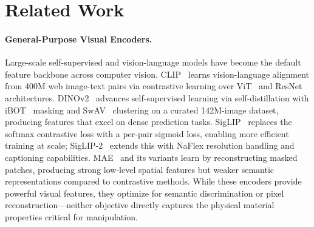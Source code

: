 \documentclass{article}
\begin{document}
\section{Related Work}
\label{sec:related}

\paragraph{General-Purpose Visual Encoders.}
Large-scale self-supervised and vision-language models have become the default feature backbone across computer vision. CLIP~\cite{radford2021clip} learns vision-language alignment from 400M web image-text pairs via contrastive learning over ViT~\cite{dosovitskiy2020vit} and ResNet architectures. DINOv2~\cite{oquab2024dinov2} advances self-supervised learning via self-distillation with iBOT~\cite{zhou2022ibot} masking and SwAV~\cite{caron2020swav} clustering on a curated 142M-image dataset, producing features that excel on dense prediction tasks. SigLIP~\cite{zhai2023siglip} replaces the softmax contrastive loss with a per-pair sigmoid loss, enabling more efficient training at scale; SigLIP-2~\cite{tschannen2025siglip2} extends this with NaFlex resolution handling and captioning capabilities. MAE~\cite{he2022mae} and its variants learn by reconstructing masked patches, producing strong low-level spatial features but weaker semantic representations compared to contrastive methods. While these encoders provide powerful visual features, they optimize for semantic discrimination or pixel reconstruction---neither objective directly captures the physical material properties critical for manipulation.
\end{document}
